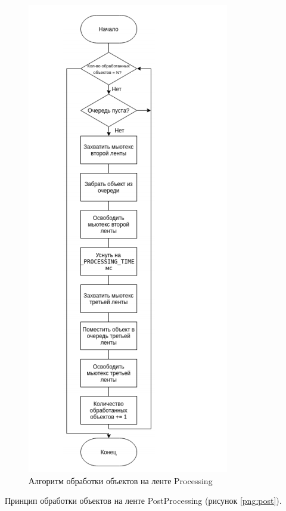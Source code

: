         \begin{figure}[h!]
            \centering
            \includegraphics[scale=0.85]{pro.png}
\caption{Алгоритм обработки объектов на ленте Processing}
            \label{png:pro}
        \end{figure} 

Принцип обработки объектов на ленте PostProcessing (рисунок \ref{png:post}).

